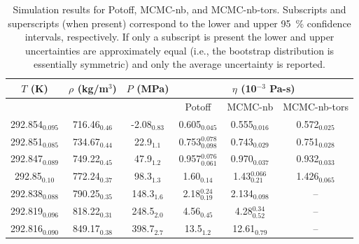 \documentclass[preprint,review,12pt]{elsarticle}
\begin{document}
	\begin{table}[htb!]
		\caption{Simulation results for Potoff, MCMC-nb, and MCMC-nb-tors. Subscripts and superscripts (when present) correspond to the lower and upper 95~\% confidence intervals, respectively. If only a subscript is present the lower and upper uncertainties are approximately equal (i.e., the bootstrap distribution is essentially symmetric) and only the average uncertainty is reported.} \label{tab:tabulated_values}
		\begin{center}
			\begin{tabular}{|c|c|c|c|c|c|}
				\hline
				\multicolumn{1}{|c}{$T$ (K)} & \multicolumn{1}{|c}{$\rho$ (kg/m$^3$)} & \multicolumn{1}{|c}{$P$ (MPa)} & \multicolumn{3}{|c|}{$\eta$ (10$^{-3}$ Pa-s)} \\ \hline
				 &  &  & Potoff & MCMC-nb & MCMC-nb-tors \\ \hline 
				292.854$_{0.095}$ & 	716.46$_{0.46}$ & 	-2.08$_{0.83}$ & 	0.605$_{0.045}$ & 	0.555$_{0.016}$ & 	0.572$_{0.025}$ \\
				292.851$_{0.085}$ & 	734.67$_{0.44}$ & 	22.9$_{1.1}$ & 	0.753$^{0.078}_{0.098}$ & 	0.743$_{0.029}$ & 	0.751$_{0.028}$ \\
				292.847$_{0.089}$ & 	749.22$_{0.45}$ & 	47.9$_{1.2}$ & 	0.957$^{0.076}_{0.061}$ & 	0.970$_{0.037}$ & 	0.932$_{0.033}$ \\
				292.85$_{0.10}$ & 	772.24$_{0.37}$ & 	98.3$_{1.3}$ & 	1.60$_{0.14}$ & 	1.43$^{0.066}_{0.21}$ & 	1.426$_{0.065}$ \\
				292.838$_{0.088}$ & 	790.25$_{0.35}$ & 	148.3$_{1.6}$ & 	2.18$^{0.24}_{0.19}$ & 	2.134$_{0.098}$ & 	-- \\
				292.819$_{0.096}$ & 	818.22$_{0.31}$ & 	248.5$_{2.0}$ & 	4.56$_{0.45}$ & 	4.28$^{0.34}_{0.52}$ & 	-- \\
				292.816$_{0.090}$ & 	849.17$_{0.38}$ & 	398.7$_{2.7}$ & 	13.5$_{1.2}$ & 	12.61$_{0.79}$ & 	-- \\

\end{tabular}
\end{center}
\end{table}
\end{document}
